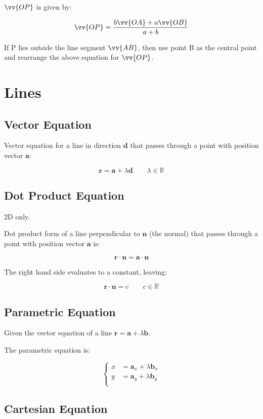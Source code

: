 \documentclass[a4paper,11pt]{article}
\newcommand{\bb}{\boldsymbol}
\begin{document}
$\vv{OP}$ is given by:

$$
\vv{OP} = \frac{b\vv{OA} + a\vv{OB}}{a + b}
$$

If P lies outside the line segment $\vv{AB}$, then use point B as the central
point and rearrange the above equation for $\vv{OP}$.




\section{Lines}

\subsection{Vector Equation}

Vector equation for a line in direction $\bb{d}$ that passes through a point
with position vector $\bb{a}$:

$$
\bb{r} = \bb{a} + \lambda \bb{d} \qquad \lambda \in \mathbb{R}
$$


\subsection{Dot Product Equation}

2D only.

Dot product form of a line perpendicular to $\bb{n}$ (the normal) that passes
through a point with position vector $\bb{a}$ is:

$$
\bb{r} \cdot \bb{n} = \bb{a} \cdot \bb{n}
$$

The right hand side evaluates to a constant, leaving:

$$
\bb{r} \cdot \bb{n} = c \qquad c \in \mathbb{R}
$$


\subsection{Parametric Equation}

Given the vector equation of a line $\bb{r} = \bb{a} + \lambda \bb{b}$.

The parametric equation is:

$$
\begin{cases}
x & = \bb{a}_x + \lambda \bb{b}_x \\
y & = \bb{a}_y + \lambda \bb{b}_y \\
\end{cases}
$$


\subsection{Cartesian Equation}
\end{document}
